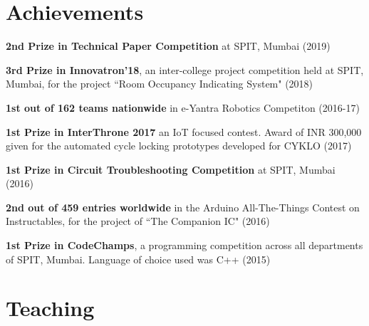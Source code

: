 \documentclass[]{deedy-resume-openfont}
\begin{document}
\hfill
\begin{minipage}[t]{0.66\textwidth} 


\section{Achievements}
\vspace{\topsep} %

\begin{tightemize}
	\item \textbf{2nd Prize in Technical Paper Competition} at SPIT, Mumbai (2019)
	
	\item \textbf{3rd Prize in Innovatron’18}, an inter-college project competition held at SPIT, Mumbai, for the project ``Room Occupancy Indicating System" (2018)
	
	\item \textbf{1st out of 162 teams nationwide} in e-Yantra Robotics Competiton (2016-17)
	
	\item \textbf{1st Prize in InterThrone 2017} an IoT focused contest. Award of INR 300,000 given for the automated cycle locking prototypes developed for CYKLO (2017)
	
	\item \textbf{1st Prize in Circuit Troubleshooting Competition} at SPIT, Mumbai (2016)
	
	
	\item \textbf{2nd out of 459 entries worldwide} in the Arduino All-The-Things Contest on \\ Instructables, for the project of ``The Companion IC" \href{https://www.instructables.com/id/The-Companion-IC/}{ \faExternalLink} (2016)
	
	\item \textbf{1st Prize in CodeChamps}, a programming competition across all departments of SPIT, Mumbai. Language of choice used was C++ (2015)
	
\end{tightemize}
\sectionsep


\section{Teaching} 
\begin{tabular}{r L{8 cm} l}
	

\end{tabular}
\end{minipage}
\end{document}

